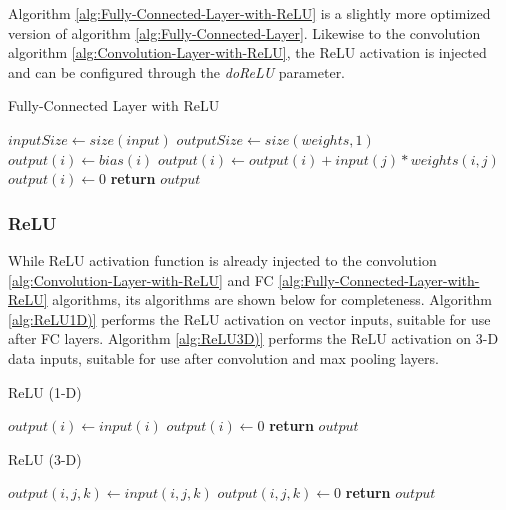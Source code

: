 Algorithm \ref{alg:Fully-Connected-Layer-with-ReLU} is a slightly more optimized version of algorithm \ref{alg:Fully-Connected-Layer}. Likewise to the convolution algorithm \ref{alg:Convolution-Layer-with-ReLU}, the ReLU activation is injected and can be configured through the \textit{doReLU} parameter.

\begin{algorithm}[H]
	\caption{Fully-Connected Layer with ReLU}\label{alg:Fully-Connected-Layer-with-ReLU}
	\begin{algorithmic}[1]
			\State $inputSize \gets size(input)$
			\State $outputSize \gets size(weights, 1)$
				\State $output(i)\gets bias(i)$
					\State $output(i)\gets output(i) + input(j) * weights(i, j)$
				\EndFor
					\State $output(i) \gets 0$
				\EndIf
			\EndFor
			\State \textbf{return} $output$
		\EndProcedure
	\end{algorithmic}
\end{algorithm}

\subsubsection{ReLU}
While ReLU activation function is already injected to the convolution \ref{alg:Convolution-Layer-with-ReLU} and FC \ref{alg:Fully-Connected-Layer-with-ReLU} algorithms, its algorithms are shown below for completeness. Algorithm \ref{alg:ReLU1D)} performs the ReLU activation on vector inputs, suitable for use after FC layers. Algorithm \ref{alg:ReLU3D)} performs the ReLU activation on 3-D data inputs, suitable for use after convolution and max pooling layers.

\begin{algorithm}[H]
	\caption{ReLU (1-D)}\label{alg:ReLU1D)}
	\begin{algorithmic}[1]
					\State $output(i) \gets input(i)$
				\Else{}
					\State $output(i) \gets 0$
				\EndIf
			\EndFor
			\State \textbf{return} $output$
		\EndProcedure
	\end{algorithmic}
\end{algorithm}

\begin{algorithm}[H]
	\caption{ReLU (3-D)}\label{alg:ReLU3D)}
	\begin{algorithmic}[1]
							\State $output(i, j, k) \gets input(i, j, k)$
						\Else{}
							\State $output(i, j, k) \gets 0$
						\EndIf
					\EndFor
				\EndFor
			\EndFor
			\State \textbf{return} $output$
		\EndProcedure
	\end{algorithmic}
\end{algorithm}

